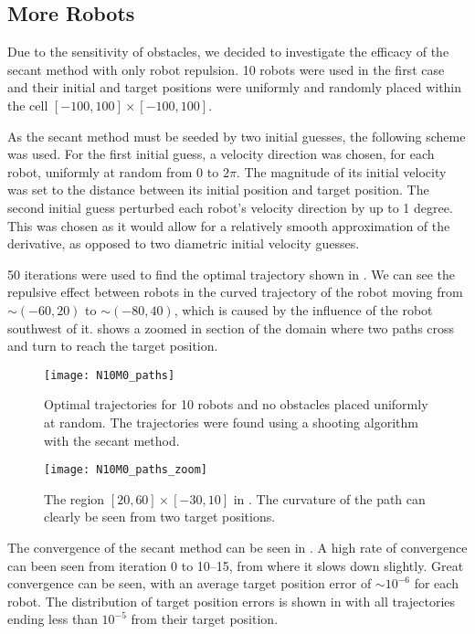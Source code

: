 \documentclass[11pt]{article}
\begin{document}
\subsection{More Robots}

Due to the sensitivity of obstacles, we decided to investigate the efficacy of the secant method with only robot repulsion. 10 robots were used in the first case and their initial and target positions were uniformly and randomly placed within the cell \([-100,100] \times [-100,100]\).

As the secant method must be seeded by two initial guesses, the following scheme was used. For the first initial guess, a velocity direction was chosen, for each robot, uniformly at random from \(0\) to \(2\pi\). The magnitude of its initial velocity was set to the distance between its initial position and target position. The second initial guess perturbed each robot's velocity direction by up to 1 degree. This was chosen as it would allow for a relatively smooth approximation of the derivative, as opposed to two diametric initial velocity guesses.

50 iterations were used to find the optimal trajectory shown in . We can see the repulsive effect between robots in the curved trajectory of the robot moving from \(\sim(-60,20)\) to \(\sim(-80,40)\), which is caused by the influence of the robot southwest of it.  shows a zoomed in section of the domain where two paths cross and turn to reach the target position.

\begin{figure}
	\centering
	\texttt{[image: N10M0\_paths]}
	\caption{Optimal trajectories for 10 robots and no obstacles placed uniformly at random. The trajectories were found using a shooting algorithm with the secant method.}
	\label{fig:n10m0-paths}
\end{figure}

\begin{figure}
	\centering
	\texttt{[image: N10M0\_paths\_zoom]}
	\caption{The region \([20,60] \times [-30,10]\) in . The curvature of the path can clearly be seen from two target positions.}
	\label{fig:n10m0-paths-zoom}
\end{figure}

\clearpage

The convergence of the secant method can be seen in . A high rate of convergence can been seen from iteration 0 to 10--15, from where it slows down slightly. Great convergence can be seen, with an average target position error of \(\sim 10^{-6}\) for each robot. The distribution of target position errors is shown in  with all trajectories ending less than \(10^{-5}\) from their target position.
\end{document}
